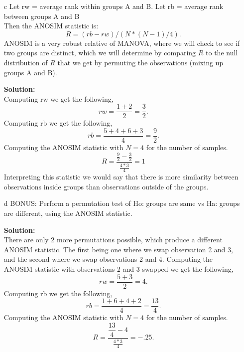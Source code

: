 \documentclass[12pt]{article}
\makeatletter
\theoremstyle{homework}
\newenvironment{exercise}[1]
{\def\@currentlabel{#1}\exercisecore}
{\endexercisecore}
\newcommand{\localhead}[1]{\par\smallskip\noindent\textbf{#1}\nobreak\\}%
\newcommand\solution{\localhead{Solution:}}
\makeatother
\begin{document}
\begin{exercise}{2}
\begin{enumerate}
      \item[c] Let rw = average rank within groups A and B. Let rb = average rank between groups A and B\\
      Then the ANOSIM statistic is:
      \begin{equation*}
        R = (rb - rw)/(N*(N-1)/4).
      \end{equation*} 
      ANOSIM is a very robust relative of MANOVA, where we will check to see if two groups are distinct, 
      which we will determine by comparing $R$ to the null distribution of $R$ that we get by permuting the 
      observations (mixing up groups A and B).\\
         \solution Computing rw we get the following, 
         \begin{equation*}
           rw = \dfrac{1 + 2}{2} = \dfrac{3}{2}.
         \end{equation*}
         Computing rb we get the following, 
         \begin{equation*}
           rb = \dfrac{5 + 4 + 6 + 3}{4} = \dfrac{9}{2}.
         \end{equation*}
         Computing the ANOSIM statistic with $N = 4$ for the number of samples. 
         \begin{equation*}
           R = \dfrac{\frac{9}{2} - \frac{3}{2}}{\frac{4*3}{4}} = 1
         \end{equation*} 
         Interpreting this statistic we would say that there is more similarity between observations inside groups than 
         observations outside of the groups. 
      \vspace{.15in}

      \item[d]   BONUS:  Perform a permutation test of Ho:  groups are same vs Ha:
      groups are different, using the ANOSIM statistic.\\
      \solution There are only 2 more permutations possible, which produce a different ANOSIM statistic. The first being 
      one where we swap observation 2 and 3, and the second where we swap observations 2 and 4. Computing the ANOSIM statistic with observations 
      2 and 3 swapped we get the following, 
      \begin{equation*}
        rw = \dfrac{5 + 3}{2} = 4.
      \end{equation*}
      Computing rb we get the following, 
      \begin{equation*}
        rb = \dfrac{1 + 6 + 4 + 2}{4} = \dfrac{13}{4}.
      \end{equation*}
      Computing the ANOSIM statistic with $N = 4$ for the number of samples. 
      \begin{equation*}
        R = \dfrac{\dfrac{13}{4} - 4}{\frac{4*3}{4}} = -.25.
      \end{equation*} 


\end{enumerate}
\end{exercise}
\end{document}
